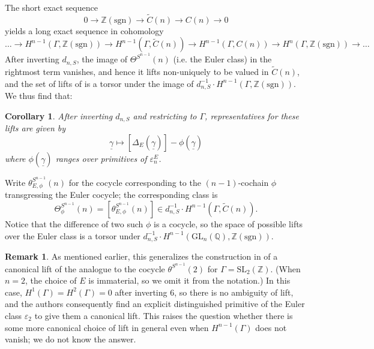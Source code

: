\documentclass[10pt]{amsart}
\newtheorem{cor}[thm]{Corollary}
\theoremstyle{definition}
\newtheorem{rem}[thm]{Remark}
\newcommand{\Z}{\mathbb{Z}}
\newcommand{\Q}{\mathbb{Q}}
\newcommand{\sgn}{\mathrm{sgn}}
\newcommand{\GL}{\mathrm{GL}}
\numberwithin{equation}{section}
\begin{document}
    The short exact sequence
    \[
    0\to\mathbb{Z}(\sgn)\to \tilde{C}(n)\to C(n)\to 0 
    \]
    yields a long exact sequence in cohomology
    \[
    \ldots \to H^{n-1}(\Gamma, \mathbb{Z}(\sgn))\to H^{n-1}(\Gamma,\tilde{C}(n))\to H^{n-1}(\Gamma, C(n)) \to H^n(\Gamma, \mathbb{Z}(\sgn)) \to \ldots
    \]
    After inverting $d_{n,S}$, the image of $\Theta^{S^{n-1}}(n)$ (i.e. the Euler class) in the rightmost term vanishes, and hence it lifts non-uniquely to be valued in $\tilde{C}(n)$, and the set of lifts of is a torsor under the image of $d_{n,S}^{-1} \cdot H^{n-1}(\Gamma, \mathbb{Z}(\sgn))$. We thus find that:

    \begin{cor} \label{cor:lifts}
        After inverting $d_{n,S}$ and restricting to $\Gamma$, representatives for these lifts are given by
        \[
        \underline{\gamma}\mapsto [\Delta_E(\underline{\gamma})]-\phi(\underline{\gamma})
        \]
        where $\phi(\underline{\gamma})$ ranges over primitives of $\varepsilon_n^E$.
    \end{cor}

    Write $\theta_{E,\phi}^{S^{n-1}}(n)$ for the cocycle corresponding to the $(n-1)$-cochain $\phi$ transgressing the Euler cocycle; the corresponding class is
    \begin{equation} \label{eq:eulerlift}
    \Theta_\phi^{S^{n-1}}(n) = [\theta_{E,\phi}^{S^{n-1}}(n)] \in d_{n,S}^{-1} \cdot H^{n-1}(\Gamma, \tilde{C}(n)).
    \end{equation}
    Notice that the difference of two such $\phi$ is a cocycle, so the space of possible lifts over the Euler class is a torsor under $d_{n,S}^{-1} \cdot H^{n-1}(\GL_n(\Q), \Z(\sgn))$.

    \begin{rem}
        As mentioned earlier, this generalizes the construction in \cite[\S5]{SV} of a canonical lift of the analogue to the cocycle $\theta^{S^{n-1}}(2)$ for $\Gamma= \mathrm{SL}_2(\mathbb{Z})$. (When $n=2$, the choice of $E$ is immaterial, so we omit it from the notation.) In this case, $H^1(\Gamma)=H^2(\Gamma)=0$ after inverting $6$, so there is no ambiguity of lift, and the authors consequently find an explicit distinguished primitive of the Euler class $\varepsilon_2$ to give them a canonical lift. This raises the question whether there is some more canonical choice of lift in general even when $H^{n-1}(\Gamma)$ does not vanish; we do not know the answer.
    \end{rem}
\end{document}
